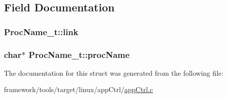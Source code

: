 \subsection{Field Documentation}
\subsubsection[{\texorpdfstring{link}{link}}]{ Proc\+Name\+\_\+t\+::link}\hypertarget{struct_proc_name__t_a93b8469b828a15859cd0cf105f48b3c2}{}\label{struct_proc_name__t_a93b8469b828a15859cd0cf105f48b3c2}
\subsubsection[{\texorpdfstring{proc\+Name}{procName}}]{\setlength{\rightskip}{0pt plus 5cm}char$\ast$ Proc\+Name\+\_\+t\+::proc\+Name}\hypertarget{struct_proc_name__t_ab41b4e9205e9255cbba3638c59c0157b}{}\label{struct_proc_name__t_ab41b4e9205e9255cbba3638c59c0157b}


The documentation for this struct was generated from the following file\+:\begin{DoxyCompactItemize}
\item 
framework/tools/target/linux/app\+Ctrl/\hyperlink{app_ctrl_8c}{app\+Ctrl.\+c}\end{DoxyCompactItemize}
